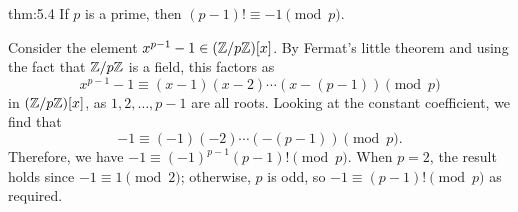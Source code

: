 \begin{theo}{thm:5.4}
    If $p$ is a prime, then $(p-1)! \equiv -1 \pmod p$. 
\end{theo}
\begin{pf}
    Consider the element $x^{p-1} - 1 \in (\mathbb{Z}/p\mathbb{Z})[x]$. By Fermat's little theorem 
    and using the fact that $\mathbb{Z}/p\mathbb{Z}$ is a field, this factors as 
    \[ x^{p-1} - 1 \equiv (x-1)(x-2) \cdots (x-(p-1)) \pmod p \] 
    in $(\mathbb{Z}/p\mathbb{Z})[x]$, as $1, 2, \dots, p-1$ are all roots. Looking at the constant 
    coefficient, we find that 
    \[ -1 \equiv (-1)(-2) \cdots (-(p-1)) \pmod p. \] 
    Therefore, we have $-1 \equiv (-1)^{p-1} (p-1)! \pmod p$. When $p = 2$, 
    the result holds since $-1 \equiv 1 \pmod 2$; otherwise, $p$ is odd, 
    so $-1 \equiv (p-1)! \pmod p$ as required. 
\end{pf}